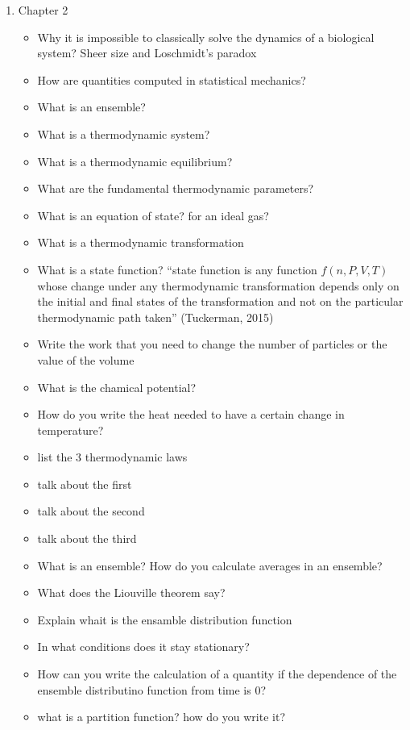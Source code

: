 \begin{enumerate}
    \item Chapter 2
    \begin{itemize}
        \item Why it is impossible to classically solve the dynamics of a biological system? Sheer size and Loschmidt's paradox
        \item How are quantities computed in statistical mechanics?
        \item What is an ensemble?
        \item What is a thermodynamic system?
        \item What is a thermodynamic equilibrium?
        \item What are the fundamental thermodynamic parameters?
        \item What is an equation of state? for an ideal gas?
        \item What is a thermodynamic transformation
        \item What is a state function? “state function is any function $f(n,P,V,T)$ whose change under any thermodynamic transformation depends only on the initial and final states of the transformation and not on the particular thermodynamic path taken” (Tuckerman, 2015)
        \item Write the work that you need to change the number of particles or the value of the volume
        \item What is the chamical potential?
        \item How do you write the heat needed to have a certain change in temperature?
        \item list the 3 thermodynamic laws
        \item talk about the first
        \item talk about the second
        \item talk about the third
        \item What is an ensemble? How do you calculate averages in an ensemble?
        \item What does the Liouville theorem say?
        \item Explain whait is the ensamble distribution function
        \item In what conditions does it stay stationary?
        \item How can you write the calculation of a quantity if the dependence of the ensemble distributino function from time is 0?
        \item what is a partition function? how do you write it?

\end{itemize}
\end{enumerate}
